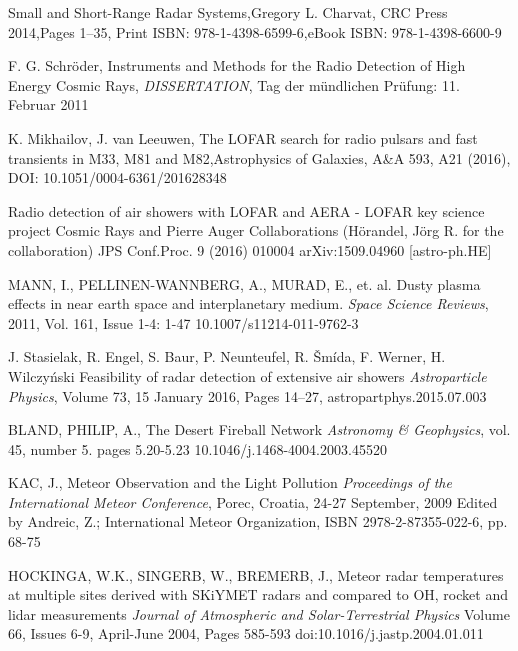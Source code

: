 \documentclass[twoside]{ctuthesis}
\theoremstyle{plain}
\theoremstyle{definition}
\theoremstyle{note}
\begin{document}
\begin{thebibliography}{99}




Small and Short-Range Radar Systems,Gregory L. Charvat, CRC Press 2014,Pages 1–35, Print ISBN: 978-1-4398-6599-6,eBook ISBN: 978-1-4398-6600-9

F. G. Schröder, Instruments and Methods for the Radio Detection of High Energy Cosmic Rays,
\emph{DISSERTATION}, Tag der mündlichen Prüfung: 11. Februar 2011

K. Mikhailov, J. van Leeuwen, The LOFAR search for radio pulsars and fast transients in M33, M81 and M82,Astrophysics of Galaxies, A\&A 593, A21 (2016), DOI: 10.1051/0004-6361/201628348

Radio detection of air showers with LOFAR and AERA - LOFAR key science project Cosmic Rays and Pierre Auger Collaborations (Hörandel, Jörg R. for the collaboration) JPS Conf.Proc. 9 (2016) 010004 arXiv:1509.04960 [astro-ph.HE]

MANN, I., PELLINEN-WANNBERG, A., MURAD, E., et. al.
Dusty plasma effects in near earth space and interplanetary medium.
\emph{Space Science Reviews}, 2011, Vol. 161, Issue 1-4: 1-47 
10.1007/s11214-011-9762-3 

J. Stasielak, R. Engel, S. Baur, P. Neunteufel, R. Šmída, F. Werner, H. Wilczyński
Feasibility of radar detection of extensive air showers
\emph{Astroparticle Physics}, Volume 73, 15 January 2016, Pages 14–27, astropartphys.2015.07.003 


BLAND, PHILIP, A.,
The Desert Fireball Network
\emph{Astronomy \& Geophysics}, vol. 45, number 5. pages 5.20-5.23
10.1046/j.1468-4004.2003.45520

KAC, J.,
Meteor Observation and the Light Pollution
\emph{Proceedings of the International Meteor Conference}, Porec, Croatia, 24-27 September, 2009 Edited by Andreic, Z.;  International Meteor Organization, ISBN 2978-2-87355-022-6, pp. 68-75

HOCKINGA, W.K., SINGERB, W., BREMERB, J.,
Meteor radar temperatures at multiple sites derived with SKiYMET radars and compared to OH, rocket and lidar measurements
\emph{Journal of Atmospheric and Solar-Terrestrial Physics}
Volume 66, Issues 6-9, April-June 2004, Pages 585-593
doi:10.1016/j.jastp.2004.01.011


\end{thebibliography}
\end{document}
